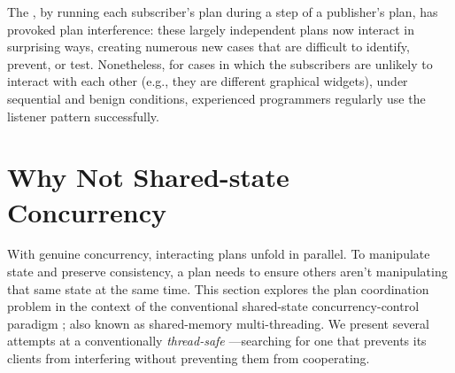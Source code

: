 \documentclass{llncs}
\begin{document}
The , by running each subscriber's plan during a
step of a publisher's plan, has provoked plan interference: these
largely independent plans now interact in surprising ways, creating
numerous new cases that are difficult to identify, prevent, or
test. Nonetheless, for cases in which the subscribers are unlikely to
interact with each other (e.g., they are different graphical widgets),
under sequential and benign conditions, experienced programmers
regularly use the listener pattern successfully.


\section{Why Not Shared-state Concurrency}

With genuine concurrency, interacting plans unfold in parallel. To
manipulate state and preserve consistency, a plan needs to ensure
others aren't manipulating that same state at the same time. This
section explores the plan coordination problem in the context of the
conventional shared-state concurrency-control paradigm
\cite{VanRoyHaridi}; also known as shared-memory multi-threading. We
present several attempts at a conventionally \emph{thread-safe}
---searching for one that prevents its clients from
interfering without preventing them from
cooperating. 
\end{document}
